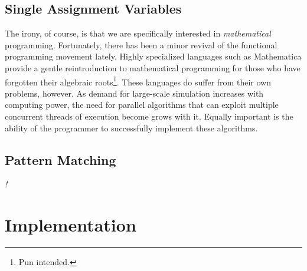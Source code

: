 \documentclass[twocolumn,a4paper,10pt]{article}
\newcommand{\TODO}{{\huge\emph{\color{red}!}}}
\begin{document}
\subsection{Single Assignment Variables}
The irony, of course, is that we are specifically interested in \emph{mathematical} programming. Fortunately, there has been a minor revival of the functional programming movement lately. Highly specialized languages such as Mathematica provide a gentle reintroduction to mathematical programming for those who have forgotten their algebraic roots\footnote{Pun intended.}. These languages do suffer from their own problems, however. As demand for large-scale simulation increases with computing power, the need for parallel algorithms that can exploit multiple concurrent threads of execution become grows with it. Equally important is the ability of the programmer to successfully implement these algorithms.

\subsection{Pattern Matching}


\TODO 

\section{Implementation}
\end{document}
